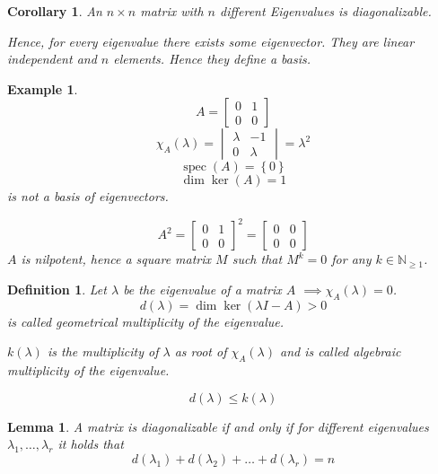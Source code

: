 \documentclass{article}
\newtheorem{example}{Example}  \numberwithin{example}{section}
\newtheorem{definition}{Definition}  \numberwithin{definition}{section}
\newtheorem{lemma}{Lemma}  \numberwithin{lemma}{section}
\newtheorem*{corollary}{Corollary}%
\newcommand{\set}[1]{\left\{#1\right\}}
\begin{document}
\begin{corollary} %
  An $n\times n$ matrix with $n$ different Eigenvalues is diagonalizable.

  Hence, for every eigenvalue there exists some eigenvector. They are linear independent and $n$ elements.
  Hence they define a basis.
\end{corollary}

\begin{example} %
  \[ A = \begin{bmatrix} 0 & 1 \\ 0 & 0 \end{bmatrix} \]
  \[ \chi_A(\lambda) = \begin{vmatrix} \lambda & -1 \\ 0 & \lambda \end{vmatrix} = \lambda^2 \]
  \[ \operatorname{spec}(A) = \set{0} \]
  \[ \dim\ker(A) = 1 \]
  is not a basis of eigenvectors.

  \[ A^2 = \begin{bmatrix} 0 & 1 \\ 0 & 0 \end{bmatrix}^2 = \begin{bmatrix} 0 & 0 \\ 0 & 0 \end{bmatrix} \]
  $A$ is nilpotent, hence a square matrix $M$ such that $M^k = 0$ for any $k \in \mathbb N_{\geq1}$.
\end{example}

\begin{definition} %
  Let $\lambda$ be the eigenvalue of a matrix $A$ $\implies \chi_A(\lambda) = 0$.
  \[ d(\lambda) = \dim\ker(\lambda I - A) > 0 \]
  is called \emph{geometrical multiplicity of the eigenvalue}.

  $k(\lambda)$ is the multiplicity of $\lambda$ as root of $\chi_A(\lambda)$
  and is called \emph{algebraic multiplicity of the eigenvalue}.

  \[ d(\lambda) \leq k(\lambda) \]
\end{definition}

\begin{lemma} %
  A matrix is diagonalizable if and only if for different eigenvalues $\lambda_1, \dots, \lambda_r$ it holds that
  \[ d(\lambda_1) + d(\lambda_2) + \dots + d(\lambda_r) = n \]
\end{lemma}
\end{document}
